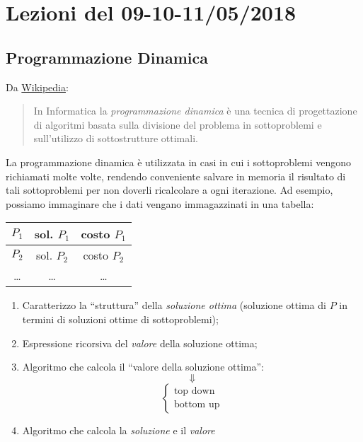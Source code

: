\section{Lezioni del 09-10-11/05/2018}

\subsection{Programmazione Dinamica}

Da \href{https://it.wikipedia.org/wiki/Programmazione_dinamica}{Wikipedia}: 
\begin{quote}
    In Informatica la \emph{programmazione dinamica} è una tecnica di progettazione di algoritmi basata sulla divisione del problema in 
    sottoproblemi e sull'utilizzo di sottostrutture ottimali. 
\end{quote}

La programmazione dinamica è utilizzata in casi in cui i sottoproblemi vengono richiamati molte volte, rendendo
conveniente salvare in memoria il risultato di tali sottoproblemi per non doverli ricalcolare a ogni iterazione. Ad esempio, possiamo immaginare che i dati vengano
immagazzinati in una tabella:

\begin{center}
    \begin{tabular}{|c|c|c|}
        \hline
        $P_1$ & sol. $P_1$ & costo $P_1$ \\
        \hline 
        $P_2$ & sol. $P_2$ & costo $P_2$ \\
        \hline
        \dots & \dots & \dots \\
        \hline
    \end{tabular}    
\end{center}

\begin{enumerate}
    \item Caratterizzo la ``struttura'' della \emph{soluzione ottima} (soluzione ottima di $P$ in termini di soluzioni ottime di sottoproblemi);
    \item Espressione ricorsiva del \emph{valore} della soluzione ottima;
    \item Algoritmo che calcola il ``valore della soluzione ottima'':
    $$\Downarrow$$
    \[
        \begin{cases}
            \text{top down} \\
            \text{bottom up}
        \end{cases}
    \]
    \item Algoritmo che calcola la \emph{soluzione} e il \emph{valore}
\end{enumerate}

